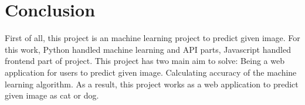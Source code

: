 \documentclass[onecolumn]{article}
\begin{document}
\section{Conclusion}
First of all, this project is an machine learning project to predict given image. For this work, Python handled  machine learning and API parts, Javascript handled frontend part of project.
\newline
\newline
This project has two main aim to solve:
\newline
\newline
Being a web application for users to predict given image.
\newline
Calculating accuracy of the machine learning algorithm.
\newline
\newline
As a result, this project works as a web application to predict given image as cat or dog. 
\end{document}
